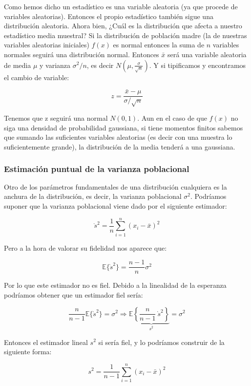 \documentclass[12pt,a4paper]{book}
\newcommand{\E}{\mathbb{E}}
\newcommand{\EE}[1]{ \mathbb{E} \{ #1 \}  }
\newcommand{\Corchetes}[1]{\left\lbrace #1 \right\rbrace}
\newcommand{\parentesis}[1]{\left( #1 \right)}
\begin{document}
Como hemos dicho un estadístico es una variable aleatoria (ya que procede de variables aleatorias). Entonces el propio estadístico también sigue una distribución aleatoria. Ahora bien, ¿Cuál es la distribución que afecta a nuestro estadístico media muestral? Si la distribución de población madre (la de nuestras variables aleatorias iniciales) $f(x)$ es normal entonces la suma de $n$ variables normales seguirá una distribución normal. Entonces $\bar{x}$ será una variable aleatoria de media $\mu$ y varianza $\sigma^2/n$, es decir $N\parentesis{\mu, \frac{\sigma}{\sqrt{n}}}$. Y si tipificamos y encontramos el cambio de variable: 

\begin{equation}
z = \dfrac{\bar{x}-\mu}{\sigma/\sqrt{n}}
\end{equation}

Tenemos que z seguirá una normal $N(0,1)$. Aun en el caso de que $f(x)$ no siga una densidad de probabilidad gaussiana, si tiene momentos finitos sabemos que sumando las suficientes variables aleatorias (es decir con una muestra lo suficientemente grande), la distribución de la media tenderá a una gaussiana. 

\subsubsection{Estimación puntual de la varianza poblacional}
Otro de los parámetros fundamentales de una distribución cualquiera es la anchura de la distribución, es decir, la varianza poblacional $\sigma^2$. Podríamos suponer que la varianza poblacional viene dado por el siguiente estimador:

$$ \grave{s}^2  = \dfrac{1}{n} \sum_{i=1}^n (x_i - \bar{x})^2 $$

Pero a la hora de valorar su fidelidad nos aparece que:

$$ \EE{\grave{s}^2} = \dfrac{n-1}{n} \sigma^2 $$

Por lo que este estimador no es fiel. Debido a la linealidad de la esperanza podríamos obtener que un estimador fiel sería:

$$ \dfrac{n}{n-1} \EE{\grave{s}^2} = \sigma^2 \Longrightarrow \E \underbrace{\Corchetes{\frac{n}{n-1} \ \grave{s}^2}}_{s^2} = \sigma^2 $$

Entonces el estimador lineal $s^2$ si sería fiel, y lo podríamos construir de la siguiente forma:

\begin{equation}
s^2 = \dfrac{1}{n-1} \sum_{i=1}^n (x_i - \bar{x})^2
\end{equation}
\end{document}
